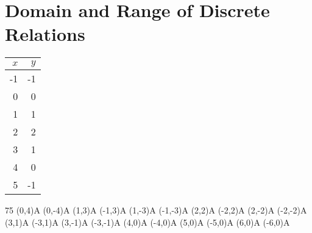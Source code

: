 \section{Domain and Range of Discrete Relations}


{
    \begin{tabular}{r|r}
        $x$ & $y$ \\
        \hline\hline
        -1 &-1\\
        0&0\\
        1&1\\
        2&2\\
        3&1\\
        4&0\\
        5&-1\\
    \end{tabular}
    \vspace{0.75in}
}



\myWideProblemWithContent
{
    \begin{myTikzpictureGrid}{0.35} {7}{5}
        \tkzDefPoint(0,4){A} \myDrawPointA
        \tkzDefPoint(0,-4){A} \myDrawPointA
        \tkzDefPoint(1,3){A} \myDrawPointA
        \tkzDefPoint(-1,3){A} \myDrawPointA
        \tkzDefPoint(1,-3){A} \myDrawPointA
        \tkzDefPoint(-1,-3){A} \myDrawPointA
        \tkzDefPoint(2,2){A} \myDrawPointA
        \tkzDefPoint(-2,2){A} \myDrawPointA
        \tkzDefPoint(2,-2){A} \myDrawPointA
        \tkzDefPoint(-2,-2){A} \myDrawPointA
        \tkzDefPoint(3,1){A} \myDrawPointA
        \tkzDefPoint(-3,1){A} \myDrawPointA
        \tkzDefPoint(3,-1){A} \myDrawPointA
        \tkzDefPoint(-3,-1){A} \myDrawPointA
        \tkzDefPoint(4,0){A} \myDrawPointA
        \tkzDefPoint(-4,0){A} \myDrawPointA
        \tkzDefPoint(5,0){A} \myDrawPointA
        \tkzDefPoint(-5,0){A} \myDrawPointA
        \tkzDefPoint(6,0){A} \myDrawPointA
        \tkzDefPoint(-6,0){A} \myDrawPointA
    \end{myTikzpictureGrid}
}
